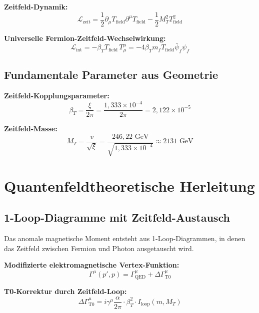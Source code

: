 \documentclass[12pt,a4paper]{article}
\numberwithin{equation}{section}
\newcommand{\calL}{\mathcal{L}}
\begin{document}
	\textbf{Zeitfeld-Dynamik:}
	\begin{equation}
		\calL_{\text{zeit}} = \frac{1}{2}\partial_\mu T_{\text{field}} \partial^\mu T_{\text{field}} - \frac{1}{2}M_T^2 T_{\text{field}}^2
	\end{equation}
	
	\textbf{Universelle Fermion-Zeitfeld-Wechselwirkung:}
	\begin{equation}
		\calL_{\text{int}} = -\beta_T T_{\text{field}} \, T^\mu_\mu = -4\beta_T m_f T_{\text{field}} \bar{\psi}_f \psi_f
	\end{equation}
	
	\subsection{Fundamentale Parameter aus Geometrie}
	
	\textbf{Zeitfeld-Kopplungsparameter:}
	\begin{equation}
		\beta_T = \frac{\xi}{2\pi} = \frac{1{,}333 \times 10^{-4}}{2\pi} = 2{,}122 \times 10^{-5}
	\end{equation}
	
	\textbf{Zeitfeld-Masse:}
	\begin{equation}
		M_T = \frac{v}{\sqrt{\xi}} = \frac{246{,}22 \text{ GeV}}{\sqrt{1{,}333 \times 10^{-4}}} \approx 2131 \text{ GeV}
	\end{equation}
	
	\section{Quantenfeldtheoretische Herleitung}
	
	\subsection{1-Loop-Diagramme mit Zeitfeld-Austausch}
	
	Das anomale magnetische Moment entsteht aus 1-Loop-Diagrammen, in denen das Zeitfeld zwischen Fermion und Photon ausgetauscht wird.
	
	\textbf{Modifizierte elektromagnetische Vertex-Funktion:}
	\begin{equation}
		\Gamma^\mu(p',p) = \Gamma^\mu_{\text{QED}} + \Delta\Gamma^\mu_{\text{T0}}
	\end{equation}
	
	\textbf{T0-Korrektur durch Zeitfeld-Loop:}
	\begin{equation}
		\Delta\Gamma^\mu_{\text{T0}} = i\gamma^\mu \frac{\alpha}{2\pi} \cdot \beta_T^2 \cdot I_{\text{loop}}(m,M_T)
	\end{equation}
	
\end{document}
